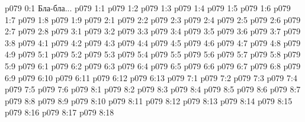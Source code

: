 \author{Архангел}
\vs p079 0:1  Бла-бла...
\vs p079 1:1 
\vs p079 1:2 \pc 
\vs p079 1:3 \pc 
\vs p079 1:4 
\vs p079 1:5 
\vs p079 1:6 
\vs p079 1:7 
\vs p079 1:8 
\vs p079 1:9 
\vs p079 2:1 
\vs p079 2:2 
\vs p079 2:3 \pc 
\vs p079 2:4 \pc 
\vs p079 2:5 
\vs p079 2:6 
\vs p079 2:7 \pc 
\vs p079 2:8 
\vs p079 3:1 
\vs p079 3:2 
\vs p079 3:3 \pc 
\vs p079 3:4 
\vs p079 3:5 
\vs p079 3:6 \pc 
\vs p079 3:7 
\vs p079 3:8 
\vs p079 4:1 
\vs p079 4:2 
\vs p079 4:3 
\vs p079 4:4 
\vs p079 4:5 
\vs p079 4:6 
\vs p079 4:7 
\vs p079 4:8 
\vs p079 4:9 
\vs p079 5:1 
\vs p079 5:2 
\vs p079 5:3 \pc 
\vs p079 5:4 
\vs p079 5:5 
\vs p079 5:6 \pc 
\vs p079 5:7 
\vs p079 5:8 
\vs p079 5:9 
\vs p079 6:1 
\vs p079 6:2 
\vs p079 6:3 
\vs p079 6:4 
\vs p079 6:5 
\vs p079 6:6 
\vs p079 6:7 
\vs p079 6:8 
\vs p079 6:9 
\vs p079 6:10 
\vs p079 6:11 
\vs p079 6:12 
\vs p079 6:13 
\vs p079 7:1 
\vs p079 7:2 
\vs p079 7:3 \pc 
\vs p079 7:4 \pc 
\vs p079 7:5 
\vs p079 7:6 
\vs p079 8:1 
\vs p079 8:2 
\vs p079 8:3 
\vs p079 8:4 
\vs p079 8:5 \pc 
\vs p079 8:6 
\vs p079 8:7 
\vs p079 8:8 
\vs p079 8:9 
\vs p079 8:10 
\vs p079 8:11 
\vs p079 8:12 
\vs p079 8:13 
\vs p079 8:14 
\vs p079 8:15 \pc 
\vs p079 8:16 
\vs p079 8:17 
\vsetoff
\vs p079 8:18 
\quizlink
